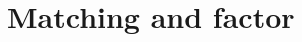 \documentclass[2pt]{article}
\newtheorem{definition}{definition}
\begin{document}
\begin{CJK*}{UTF8}{bkai}
\begin{paracol}{2}
\end{paracol}
\vspace{2cm} %

\section*{Matching and factor}
\begin{paracol}{2} %
    \switchcolumn[0]

\end{paracol}

\end{CJK*}
\end{document}
